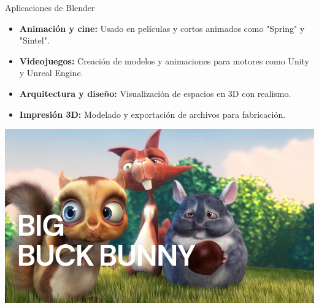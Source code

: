 \begin{frame}{Aplicaciones de Blender}
    \begin{itemize}
        \item \textbf{Animación y cine:} Usado en películas y cortos animados como "Spring" y "Sintel".
        \item \textbf{Videojuegos:} Creación de modelos y animaciones para motores como Unity y Unreal Engine.
        \item \textbf{Arquitectura y diseño:} Visualización de espacios en 3D con realismo.
        \item \textbf{Impresión 3D:} Modelado y exportación de archivos para fabricación.
    \end{itemize}
    \begin{center}
        \includegraphics[width=0.6\linewidth]{01_Blender/BigBuckBunny.png}
    \end{center}
\end{frame}
